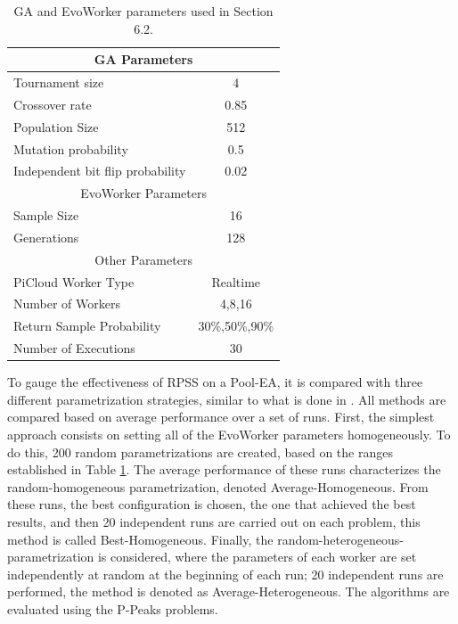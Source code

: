 \begin{table}[t]
\renewcommand{\arraystretch}{1.3}
\caption{GA and EvoWorker parameters used in Section 6.2.}
\label{tab:params}
\centering
\begin{tabular}{|l|c|}
\hline
\multicolumn{2}{|c|}{GA Parameters} \\
\hline
Tournament size & 4 \\
Crossover rate & 0.85  \\
Population Size & 512 \\
Mutation probability & 0.5 \\
Independent bit flip probability  & 0.02 \\
\hline
\multicolumn{2}{|c|}{EvoWorker Parameters} \\
\hline
Sample Size & 16 \\
Generations & 128 \\
\hline
\multicolumn{2}{|c|}{Other Parameters} \\
\hline
PiCloud Worker Type & Realtime \\
Number of Workers & 4,8,16 \\
Return Sample Probability & 30\%,50\%,90\% \\
Number of Executions & 30 \\

\hline

\end{tabular}
\end{table}

To gauge the effectiveness of RPSS on a Pool-EA, it is compared with three different parametrization strategies, similar to what is done in \cite{fuku1,fuku2}.
All methods are compared based on average performance over a set of runs.
First, the simplest approach consists on setting all of the EvoWorker parameters homogeneously.
To do this, 200 random parametrizations are created, based on the ranges established in Table \ref{tab:params}.
The average performance of these runs characterizes the random-homogeneous parametrization, denoted Average-Homogeneous.
From these runs, the best configuration is chosen, the one that achieved the best results,
and then 20 independent runs are carried out on each problem, this method is called Best-Homogeneous.
Finally, the random-heterogeneous-parametrization is considered, where the parameters of each worker are set independently at random at
the beginning of each run; 20 independent runs are performed, the method is denoted as Average-Heterogeneous.
The algorithms are evaluated using the P-Peaks problems.

